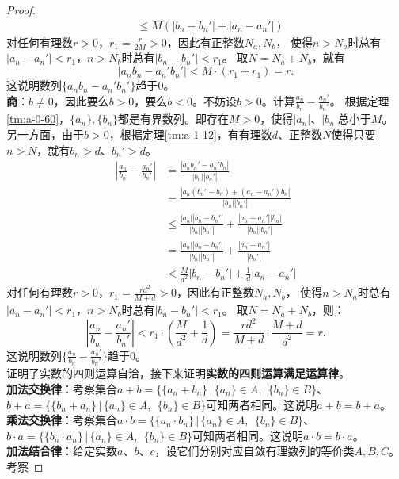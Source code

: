 \documentclass[12pt,UTF8,fontset=none]{ctexbook}
\begin{document}
\begin{appendix}
\begin{proof}
\begin{align*}
        &\leqslant M(|b_n - b_n'| + |a_n - a_n'|)  
    \end{align*}
    对任何有理数$r>0$，$r_1 = \frac{r}{2M}>0$，因此有正整数$N_a,N_b$，
    使得$n>N_a$时总有$|a_n - a_n'| < r_1$，$n>N_b$时总有$|b_n - b_n'| < r_1$。
    取$N=N_a+N_b$，就有
    $$ |a_nb_n - a_n'b_n'| < M\cdot \left(r_1 + r_1\right) = r.$$
    这说明数列$\{a_nb_n - a_n'b_n'\}$趋于$0$。\\
    \textbf{商}：$b\neq 0$，因此要么$b>0$，要么$b<0$。不妨设$b>0$。计算$\frac{a_n}{b_n} - \frac{a_n'}{b_n'}$。
    根据定理\ref{tm:a-0-60}，$\{a_n\}, \{b_n\}$都是有界数列。即存在$M>0$，使得$|a_n|$、$|b_n|$总小于$M$。
    另一方面，由于$b>0$，根据定理\ref{tm:a-1-12}，有有理数$d$、正整数$N$使得只要$n>N$，就有$b_n>d$、$b_n'>d$。
    \begin{align*}
        \left|\frac{a_n}{b_n} - \frac{a_n'}{b_n'}\right| &= \frac{|a_nb_n' - a_n'b_n|}{|b_n||b_n'|}  \\
        &= \frac{|a_n(b_n' - b_n) + (a_n - a_n')b_n|}{|b_n||b_n'|}  \\
        &\leqslant \frac{|a_n||b_n - b_n'|}{|b_n||b_n'|} + \frac{|a_n - a_n'||b_n|}{|b_n||b_n'|}  \\
        &= \frac{|a_n||b_n - b_n'|}{|b_n||b_n'|} + \frac{|a_n - a_n'|}{|b_n'|}  \\
        &< \frac{M}{d^2}|b_n - b_n'| + \frac{1}{d}|a_n - a_n'|  
    \end{align*}
    对任何有理数$r>0$，$r_1 = \frac{rd^2}{M+d}>0$，因此有正整数$N_a,N_b$，
    使得$n>N_a$时总有$|a_n - a_n'| < r_1$，$n>N_b$时总有$|b_n - b_n'| < r_1$。
    取$N=N_a+N_b$，则：
    $$ \left|\frac{a_n}{b_n} - \frac{a_n'}{b_n'}\right| < r_1\cdot \left(\frac{M}{d^2} + \frac{1}{d}\right) = \frac{rd^2}{M+d}\cdot \frac{M+d}{d^2} = r.$$
    这说明数列$\{\frac{a_n}{b_n} - \frac{a_n'}{b_n'}\}$趋于$0$。\\
    证明了实数的四则运算自洽，接下来证明\textbf{实数的四则运算满足运算律}。\\
    \textbf{加法交换律}：考察集合$a + b = \{\{a_n + b_n\} \, |\, \{a_n\}\in A,\;\,\{b_n\}\in B \}$、
    $b + a = \{\{b_n + a_n\} \, |\, \{a_n\}\in A,\;\,\{b_n\}\in B \}$可知两者相同。这说明$a + b = b + a$。\\
    \textbf{乘法交换律}：考察集合$a\cdot b = \{\{a_n \cdot b_n\} \, |\, \{a_n\}\in A,\;\,\{b_n\}\in B \}$、
    $b\cdot a = \{\{b_n \cdot a_n\} \, |\, \{a_n\}\in A,\;\,\{b_n\}\in B \}$可知两者相同。这说明$a \cdot b = b \cdot a$。\\
    \textbf{加法结合律}：给定实数$a$、$b$、$c$，设它们分别对应自敛有理数列的等价类$A,B,C$。考察

\end{proof}
\end{appendix}
\end{document}
